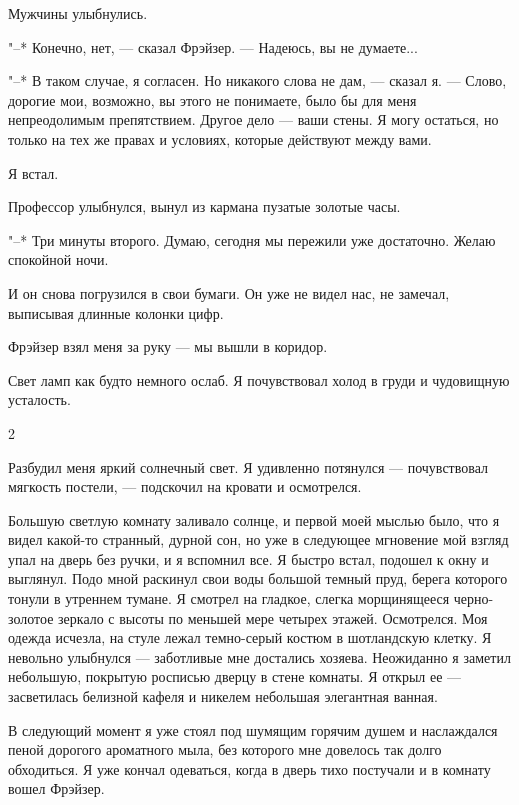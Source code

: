 Мужчины улыбнулись.

"--* Конечно, нет, --- сказал Фрэйзер. --- Надеюсь, вы не думаете...

"--* В таком случае, я согласен. Но никакого слова не дам, --- сказал  я.  ---
Слово, дорогие мои, возможно, вы этого не  понимаете,  было  бы  для  меня
непреодолимым препятствием. Другое дело --- ваши стены. Я могу остаться,  но
только на тех же правах и условиях, которые действуют между вами.

Я встал.

Профессор улыбнулся, вынул из кармана пузатые золотые часы.

"--* Три минуты второго. Думаю, сегодня мы пережили уже достаточно.  Желаю
спокойной ночи.

И он снова погрузился в свои бумаги. Он уже не видел нас,  не  замечал,
выписывая длинные колонки цифр.

Фрэйзер взял меня за руку --- мы вышли в коридор.

Свет ламп как будто немного ослаб.  Я  почувствовал  холод  в  груди  и
чудовищную усталость.

\bigskip{}



\bigskip{}

2

\bigskip{}


Разбудил  меня  яркий  солнечный  свет.   Я   удивленно   потянулся   ---
почувствовал мягкость постели, --- подскочил на кровати и осмотрелся.

Большую светлую комнату заливало солнце, и первой моей мыслью было, что
я видел какой-то странный, дурной сон, но уже в  следующее  мгновение  мой
взгляд упал на дверь без ручки, и я вспомнил все. Я быстро встал,  подошел
к окну и выглянул. Подо мной  раскинул  свои  воды  большой  темный  пруд,
берега которого тонули в утреннем тумане. Я  смотрел  на  гладкое,  слегка
морщинящееся черно-золотое  зеркало  с  высоты  по  меньшей  мере  четырех
этажей. Осмотрелся. Моя одежда исчезла, на стуле лежал темно-серый  костюм
в шотландскую клетку. Я невольно  улыбнулся  ---  заботливые  мне  достались
хозяева. Неожиданно я заметил небольшую, покрытую росписью дверцу в  стене
комнаты. Я открыл ее --- засветилась белизной  кафеля  и  никелем  небольшая
элегантная ванная.

В следующий момент я уже стоял под шумящим горячим душем и  наслаждался
пеной дорогого ароматного  мыла,  без  которого  мне  довелось  так  долго
обходиться. Я уже кончал одеваться, когда  в  дверь  тихо  постучали  и  в
комнату вошел Фрэйзер.

